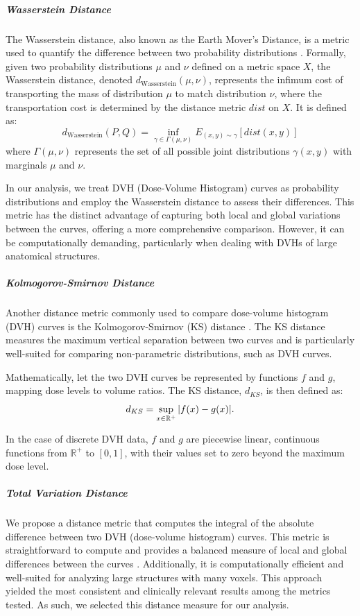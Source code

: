 \subparagraph{Wasserstein Distance}
The Wasserstein distance, also known as the Earth Mover’s Distance, is a metric used to quantify the difference between two probability distributions \cite{OLKIN1982257}.
Formally, given two probability distributions $\mu$ and $\nu$ defined on a metric space $X$, the Wasserstein distance, denoted $d_{\text{Wasserstein}}(\mu, \nu)$, represents the infimum cost of transporting the mass of distribution $\mu$ to match distribution $\nu$, where the transportation cost is determined by the distance metric $dist$ on $X$.
It is defined as:
$$d_{\text{Wasserstein}}(P, Q) = \inf_{\gamma \in \Gamma(\mu, \nu)} E_{(x,y) \sim \gamma} \left[ dist(x, y) \right]$$
where $\Gamma(\mu, \nu)$ represents the set of all possible joint distributions $\gamma(x, y)$ with marginals $\mu$ and $\nu$.

In our analysis, we treat DVH (Dose-Volume Histogram) curves as probability distributions and employ the Wasserstein distance to assess their differences.
This metric has the distinct advantage of capturing both local and global variations between the curves, offering a more comprehensive comparison.
However, it can be computationally demanding, particularly when dealing with DVHs of large anatomical structures.

\subparagraph{Kolmogorov-Smirnov Distance}
Another distance metric commonly used to compare dose-volume histogram (DVH) curves is the Kolmogorov-Smirnov (KS) distance \cite{Stephens1974}.
The KS distance measures the maximum vertical separation between two curves and is particularly well-suited for comparing non-parametric distributions, such as DVH curves.

Mathematically, let the two DVH curves be represented by functions $f$ and $g$, mapping dose levels to volume ratios. The KS distance, $d_{KS}$, is then defined as:
$$d_{KS} = \sup_{x \in \mathbb{R}^+} |{f(x)-g(x)}|.$$

In the case of discrete DVH data, $f$ and $g$ are piecewise linear, continuous functions from $\mathbb{R}^+$ to $[0,1]$, with their values set to zero beyond the maximum dose level.

\subparagraph{Total Variation Distance}
We propose a distance metric that computes the integral of the absolute difference between two DVH (dose-volume histogram) curves.
This metric is straightforward to compute and provides a balanced measure of local and global differences between the curves \cite{Chatterjee2007}.
Additionally, it is computationally efficient and well-suited for analyzing large structures with many voxels.
This approach yielded the most consistent and clinically relevant results among the metrics tested.
As such, we selected this distance measure for our analysis.

